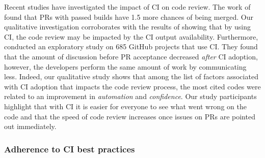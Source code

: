 Recent studies have investigated the impact of CI on code review. The work of \cite{zampetti2019study} 
found that PRs with passed builds have 1.5 more chances of being merged. Our qualitative investigation corroborates with the results of \cite{zampetti2019study} showing that by using CI, the code review may be impacted by the CI output availability. Furthermore, \cite{cassee2020silent} conducted an exploratory study on 685 GitHub projects that use CI. They found that the amount of discussion before PR acceptance decreased \textit{after} CI adoption, however, the developers perform the same amount of work by communicating less. Indeed, our qualitative study shows that among the list of factors associated with CI adoption that impacts the code review process, the most cited codes were related to an improvement in \textit{automation} and \textit{confidence}.
Our study participants highlight that with CI it is easier for everyone to see what went wrong on the code and that the speed of code review increases once issues on PRs are pointed out immediately. 

\subsubsection*{\textbf{Adherence to CI best practices}}

